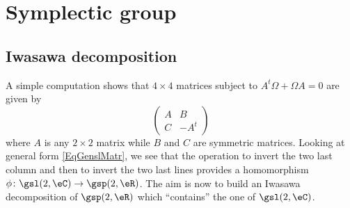 \section{Symplectic group}		\label{SecSympleGp}

\subsection{Iwasawa decomposition}

A simple computation shows that $4\times 4$ matrices subject to $A^t\Omega+\Omega A=0$ are given by
\[ 
  \begin{pmatrix}
A&B\\
C&-A^t
\end{pmatrix}
\]
where $A$ is any $2\times 2$ matrix while $B$ and $C$ are symmetric matrices. Looking at general form \eqref{EqGenslMatr}, we see that the operation to invert the two last column and then to invert the two last lines provides a homomorphism $\phi\colon \gsl(2,\eC)\to \gsp(2,\eR)$. The aim is now to build an Iwasawa decomposition of $\gsp(2,\eR)$ which ``contains'' the one of $\gsl(2,\eC)$.

